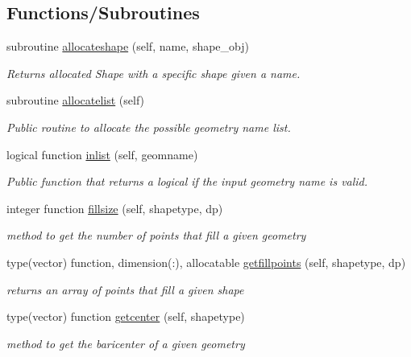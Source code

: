 \subsection*{Functions/\+Subroutines}
\begin{DoxyCompactItemize}
\item 
subroutine \mbox{\hyperlink{namespacegeometry__mod_a571a294c2a1869259d21267005c32025}{allocateshape}} (self, name, shape\+\_\+obj)
\begin{DoxyCompactList}\small\item\em Returns allocated Shape with a specific shape given a name. \end{DoxyCompactList}\item 
subroutine \mbox{\hyperlink{namespacegeometry__mod_a1b6f259b0b6be71e02ffae7670f7d8ba}{allocatelist}} (self)
\begin{DoxyCompactList}\small\item\em Public routine to allocate the possible geometry name list. \end{DoxyCompactList}\item 
logical function \mbox{\hyperlink{namespacegeometry__mod_a22dd77024fce56da299445a697256155}{inlist}} (self, geomname)
\begin{DoxyCompactList}\small\item\em Public function that returns a logical if the input geometry name is valid. \end{DoxyCompactList}\item 
integer function \mbox{\hyperlink{namespacegeometry__mod_ad790edd694561b33dad20cfa3a14e8f2}{fillsize}} (self, shapetype, dp)
\begin{DoxyCompactList}\small\item\em method to get the number of points that fill a given geometry \end{DoxyCompactList}\item 
type(vector) function, dimension(\+:), allocatable \mbox{\hyperlink{namespacegeometry__mod_a12f7679eb15f32630680f2b8504827b3}{getfillpoints}} (self, shapetype, dp)
\begin{DoxyCompactList}\small\item\em returns an array of points that fill a given shape \end{DoxyCompactList}\item 
type(vector) function \mbox{\hyperlink{namespacegeometry__mod_a4a38edbff02aa0ff5f16a16c39bf778e}{getcenter}} (self, shapetype)
\begin{DoxyCompactList}\small\item\em method to get the baricenter of a given geometry \end{DoxyCompactList}\item 

\end{DoxyCompactItemize}
